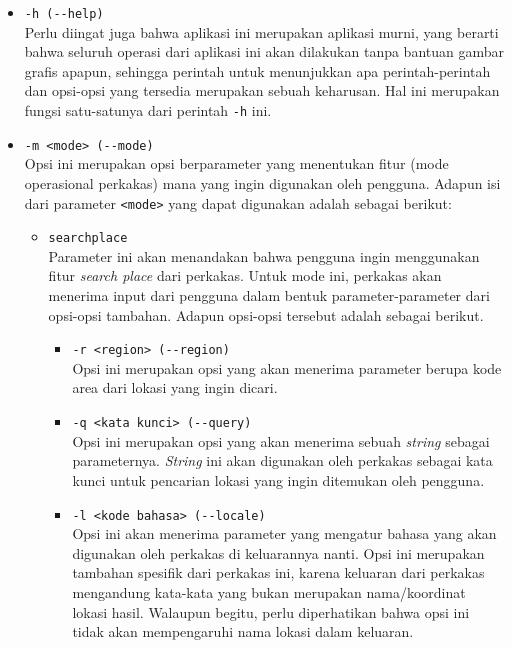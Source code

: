 \begin{itemize}
	\item \verb|-h (--help)|\\
	Perlu diingat juga bahwa aplikasi ini merupakan aplikasi \cl murni, yang berarti bahwa seluruh operasi dari aplikasi ini akan dilakukan tanpa bantuan gambar grafis apapun, sehingga perintah untuk menunjukkan apa perintah-perintah dan opsi-opsi yang tersedia merupakan sebuah keharusan. Hal ini merupakan fungsi satu-satunya dari perintah \verb|-h| ini.
	
	\item \verb|-m <mode> (--mode)|\\
	Opsi ini merupakan opsi berparameter yang menentukan fitur (mode operasional perkakas) mana yang ingin digunakan oleh pengguna. Adapun isi dari parameter \verb|<mode>| yang dapat digunakan adalah sebagai berikut:
	
	\begin{itemize}	
		\item \verb|searchplace|\\
		Parameter ini akan menandakan bahwa pengguna ingin menggunakan fitur \textit{search place} dari perkakas. Untuk mode ini, perkakas akan menerima input dari pengguna dalam bentuk parameter-parameter dari opsi-opsi tambahan. Adapun opsi-opsi tersebut adalah sebagai berikut.
			
		\begin{itemize}
			\item \verb|-r <region> (--region)|\\
			Opsi ini merupakan opsi yang akan menerima parameter berupa kode area dari lokasi yang ingin dicari.
			\item \verb|-q <kata kunci> (--query)|\\
			Opsi ini merupakan opsi yang akan menerima sebuah \textit{string} sebagai parameternya. \textit{String} ini akan digunakan oleh perkakas sebagai kata kunci untuk pencarian lokasi yang ingin ditemukan oleh pengguna.
			\item \verb|-l <kode bahasa> (--locale)|\\
			Opsi ini akan menerima parameter yang mengatur bahasa yang akan digunakan oleh perkakas di keluarannya nanti. Opsi ini merupakan tambahan spesifik dari perkakas ini, karena keluaran dari perkakas mengandung kata-kata yang bukan merupakan nama/koordinat lokasi hasil. Walaupun begitu, perlu diperhatikan bahwa opsi ini tidak akan mempengaruhi nama lokasi dalam keluaran.
		\end{itemize}
	

\end{itemize}
\end{itemize}
